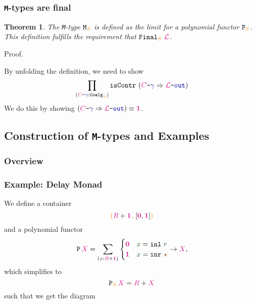 \documentclass[xelatex,mathserif,serif,notheorems]{beamer} %
\theoremstyle{plain} %
\newtheorem{thm}{Theorem}[section]
\theoremstyle{definition}
\theoremstyle{remark}
\newcommand*{\term}[1]{\textcolor{green!30!black}{#1}} %
\newcommand*{\type}[1]{\textcolor{magenta!90!black}{#1}}
\newcommand*{\container}[1]{\textcolor{orange}{#1}}
\newcommand*{\containerpair}[2]{\ensuremath{\colorlet{savedleftcolor}{.}\color{orange}\left(\color{savedleftcolor}#1\,\textcolor{orange}{\mathbf{,}}\,#2\color{orange}\right)\color{savedleftcolor}}}
\newcommand*{\unit}{\type{\textbf{1}}}
\newcommand*{\empt}{\type{\textbf{0}}}
\newcommand*{\coalg}[2]{#1\texttt{-}#2}
\newcommand*{\constant}[1]{\textcolor{orange!60!black}{\ensuremath{\mathtt{#1}}}}
\newcommand*{\function}[1]{\textcolor{blue!60!black}{\ensuremath{\mathtt{#1}}}}
\newcommand*{\constructor}[1]{\textcolor{purple!60!black}{\ensuremath{\mathtt{#1}}}}
\newcommand*{\typeformer}[1]{\ensuremath{\mathtt{#1}}}
\newcommand*{\functor}[1]{\ensuremath{\mathbf{\mathtt{#1}}}}
\newcommand*{\unitelem}{\constant{\star}} %
\newcommand{\setlengths}{
  \setlength{\abovedisplayskip}{4pt}
  \setlength{\belowdisplayskip}{4pt}
  \setlength{\abovedisplayshortskip}{2pt}
  \setlength{\belowdisplayshortskip}{2pt}
}
\begin{document}
\begin{frame}
  \frametitle{\texttt{M}-types are final}
  \begin{thm}\setlengths
    The \texttt{M}-type \(\typeformer{M}_{\container{S}}\) is defined as the limit for a polynomial functor \(\functor{P}_{\container{S}}\). This definition fulfills the requirement that \(\typeformer{Final}_{\container{S}}~\type{\mathcal{L}}\).
  \end{thm}
  \begin{block}{Proof.}\setlengths
    By unfolding the definition, we need to show
    \begin{equation}
      \prod_{(\coalg{\type{C}}{\function{\gamma}} : \mathtt{Coalg}_{\container{S}})} \mathtt{isContr}~(\coalg{\type{C}}{\function{\gamma}} \Rightarrow \coalg{\type{\mathcal{L}}}{\function{out}})
    \end{equation}
    We do this by showing \((\coalg{\type{C}}{\function{\gamma}} \Rightarrow \coalg{\type{\mathcal{L}}}{\function{out}}) \equiv \unit\).
  \end{block}
\end{frame}

\subsection{Construction of \texttt{M}-types and Examples}
\begin{frame}
  \frametitle{Overview}
  \tableofcontents[currentsubsection]
\end{frame}

\begin{frame}[fragile]
  \frametitle{Example: Delay Monad}
  We define a container
  \begin{equation}
    \containerpair{\type{R} + \unit}{[\empt, \unit]}
  \end{equation}
  and a polynomial functor
  \begin{equation}
    \functor{P}\,\type{X} = \sum_{(\term{x} : \type{R} + \unit)} \begin{cases} \empt & \term{x} = \mathtt{inl}~\term{r} \\ \unit & \term{x} = \mathtt{inr}~\unitelem \end{cases} \rightarrow \type{X},
  \end{equation}
  which simplifies to
  \begin{equation}
    \functor{P}_{\container{S}}\,\type{X} = \type{R} + \type{X}
  \end{equation}
  such that we get the diagram
  \begin{figure}[h]
    \centering
  \end{figure}
\end{frame}
\end{document}
